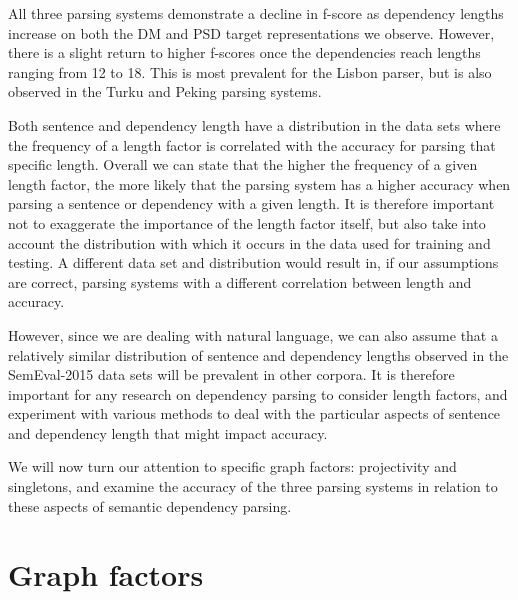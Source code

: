 All three parsing systems demonstrate a decline in f-score as dependency lengths increase on both the DM and PSD target representations we observe. However, there is a slight return to higher f-scores once the dependencies reach lengths ranging from 12 to 18. This is most prevalent for the Lisbon parser, but is also observed in the Turku and Peking parsing systems.

Both sentence and dependency length have a distribution in the data sets where the frequency of a length factor is correlated with the accuracy for parsing that specific length. Overall we can state that the higher the frequency of a given length factor, the more likely that the parsing system has a higher accuracy when parsing a sentence or dependency with a given length. It is therefore important not to exaggerate the importance of the length factor itself, but also take into account the distribution with which it occurs in the data used for training and testing. A different data set and distribution would result in, if our assumptions are correct, parsing systems with a different correlation between length and accuracy.

However, since we are dealing with natural language, we can also assume that a relatively similar distribution of sentence and dependency lengths observed in the SemEval-2015 data sets will be prevalent in other corpora. It is therefore important for any research on dependency parsing to consider length factors, and experiment with various methods to deal with the particular aspects of sentence and dependency length that might impact accuracy. 

We will now turn our attention to specific graph factors: projectivity and singletons, and examine the accuracy of the three parsing systems in relation to these aspects of semantic dependency parsing.

\section{Graph factors}

